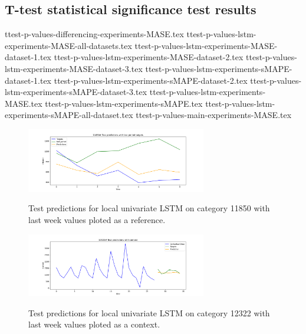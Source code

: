 \subsection{T-test statistical significance test results}
{ttest-p-values-differencing-experiments-MASE.tex}
{ttest-p-values-lstm-experiments-MASE-all-datasets.tex}
{ttest-p-values-lstm-experiments-MASE-dataset-1.tex}
{ttest-p-values-lstm-experiments-MASE-dataset-2.tex}
{ttest-p-values-lstm-experiments-MASE-dataset-3.tex}
{ttest-p-values-lstm-experiments-sMAPE-dataset-1.tex}
{ttest-p-values-lstm-experiments-sMAPE-dataset-2.tex}
{ttest-p-values-lstm-experiments-sMAPE-dataset-3.tex}
{ttest-p-values-lstm-experiments-MASE.tex}
{ttest-p-values-lstm-experiments-sMAPE.tex}
{ttest-p-values-lstm-experiments-sMAPE-all-dataset.tex}
{ttest-p-values-main-experiments-MASE.tex}


\begin{figure}
  \centering
  \caption{Test predictions for local univariate LSTM on category 11850 with last week values ploted as a reference.}
  \includegraphics[width=0.7\textwidth]{./figs/results/predictions/11850_Test_predictions_with_last_period_targets.png}
  \hfill
  \label{fig:results:predictions:11850-Test_predictions_with_last_period_targets.png}
\end{figure}

\begin{figure}
  \centering
  \caption{Test predictions for local univariate LSTM on category 12322 with last week values ploted as a context.}
  \includegraphics[width=0.7\textwidth]{./figs/results/predictions/12322_Test_predictions_with_context.png}
  \hfill
  \label{fig:results:predictions:12322-Test_predictions_with_last_period_context.png}
\end{figure}

